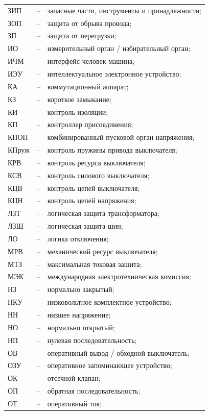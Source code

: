 \begin{longtable}{>{\raggedright\arraybackslash}m{2cm}>{\raggedright\arraybackslash}m{0.5cm}>{\raggedright\arraybackslash}m{20cm}}
ЗИП & -- & запасные части, инструменты и принадлежности; \\
ЗОП & -- & защита от обрыва провода; \\
ЗП & -- & защита от перегрузки; \\
ИО & -- & измерительный орган / избирательный орган; \\
ИЧМ & -- & интерфейс человек-машина; \\
ИЭУ & -- & интеллектуальное электронное устройство; \\
КА & -- & коммутационный аппарат; \\
КЗ & -- & короткое замыкание; \\
КИ & -- & контроль изоляции; \\
КП & -- & контроллер присоединения; \\
КПОН & -- & комбинированный пусковой орган напряжения; \\
КПруж & -- & контроль пружины привода выключателя; \\
КРВ & -- & контроль ресурса выключателя; \\
КСВ & -- & контроль силового выключателя; \\
КЦВ & -- & контроль цепей выключателя; \\
КЦН & -- & контроль цепей напряжения; \\
ЛЗТ & -- & логическая защита трансформатора; \\
ЛЗШ & -- & логическая защита шин; \\
ЛО & -- & логика отключения; \\
МРВ & -- & механический ресурс выключателя; \\
МТЗ & -- & максимальная токовая защита; \\
МЭК & -- & международная электротехническая комиссия; \\
НЗ & -- & нормально закрытый; \\
НКУ & -- & низковольтное комплектное устройство; \\
НН & -- & низшее напряжение; \\
НО & -- & нормально открытый; \\
НП & -- & нулевая последовательность; \\
ОВ & -- & оперативный вывод / обходной выключатель; \\
ОЗУ & -- & оперативное запоминающее устройство; \\
ОК & -- & отсечной клапан; \\
ОП & -- & обратная последовательность; \\
ОТ & -- & оперативный ток; \\

\end{longtable}
